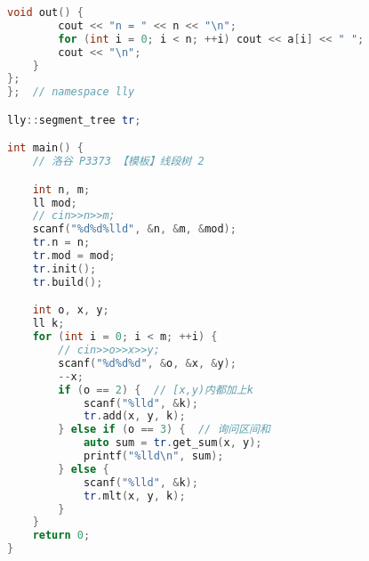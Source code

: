 \begin{lstlisting}[language={c++}]
	void out() {
		cout << "n = " << n << "\n";
		for (int i = 0; i < n; ++i) cout << a[i] << " ";
		cout << "\n";
	}
};
};  // namespace lly

lly::segment_tree tr;

int main() {
	// 洛谷 P3373 【模板】线段树 2

	int n, m;
	ll mod;
	// cin>>n>>m;
	scanf("%d%d%lld", &n, &m, &mod);
	tr.n = n;
	tr.mod = mod;
	tr.init();
	tr.build();

	int o, x, y;
	ll k;
	for (int i = 0; i < m; ++i) {
		// cin>>o>>x>>y;
		scanf("%d%d%d", &o, &x, &y);
		--x;
		if (o == 2) {  // [x,y)内都加上k
			scanf("%lld", &k);
			tr.add(x, y, k);
		} else if (o == 3) {  // 询问区间和
			auto sum = tr.get_sum(x, y);
			printf("%lld\n", sum);
		} else {
			scanf("%lld", &k);
			tr.mlt(x, y, k);
		}
	}
	return 0;
}

\end{lstlisting}